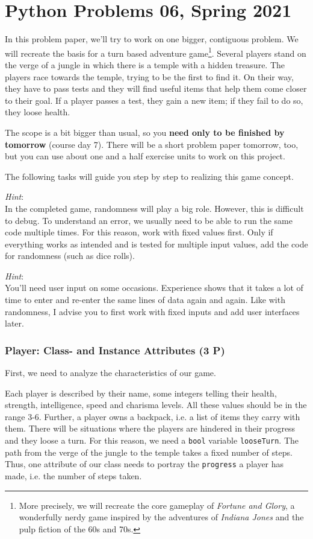 \documentclass[
	english,
	fontsize=10pt,
	parskip=half,
	titlepage=true,
	DIV=12
]{scrartcl}
\newcommand*{\inPy}[1]{\texttt{#1}}
\newcommand*{\ie}{i.\;e. }
\begin{document}
\part*{Python Problems 06, Spring 2021}
In this problem paper, we'll try to work on one bigger, contiguous problem. We will recreate the basis for a turn based adventure game\footnote{More precisely, we will recreate the core gameplay of \emph{Fortune and Glory}, a wonderfully nerdy game inspired by the adventures of \emph{Indiana Jones} and the pulp fiction of the 60s and 70s.}. Several players stand on the verge of a jungle in which there is a temple with a hidden treasure. The players race towards the temple, trying to be the first to find it. On their way, they have to pass tests and they will find useful items that help them come closer to their goal. If a player passes a test, they gain a new item; if they fail to do so, they loose health.

The scope is a bit bigger than usual, so you \textbf{need only to be finished by tomorrow} (course day 7). There will be a short problem paper tomorrow, too, but you can use about one and a half exercise units to work on this project.

The following tasks will guide you step by step to realizing this game concept.

\emph{Hint}:\\
In the completed game, randomness will play a big role. However, this is difficult to debug. To understand an error, we usually need to be able to run the same code multiple times. For this reason, work with fixed values first. Only if everything works as intended and is tested for multiple input values, add the code for randomness (such as dice rolls).

\emph{Hint}:\\
You'll need user input on some occasions. Experience shows that it takes a lot of time to enter and re-enter the same lines of data again and again. Like with randomness, I advise you to first work with fixed inputs and add user interfaces later.

\section{Player: Class- and Instance Attributes (3 P)}
First, we need to analyze the characteristics of our game.

Each player is described by their name, some integers telling their health, strength, intelligence, speed and charisma levels. All these values should be in the range 3-6. Further, a player owns a backpack, \ie a list of items they carry with them. There will be situations where the players are hindered in their progress and they loose a turn. For this reason, we need a \inPy{bool} variable \texttt{looseTurn}. The path from the verge of the jungle to the temple takes a fixed number of steps. Thus, one attribute of our class needs to portray the \texttt{progress} a player has made, \ie the number of steps taken.
\end{document}
